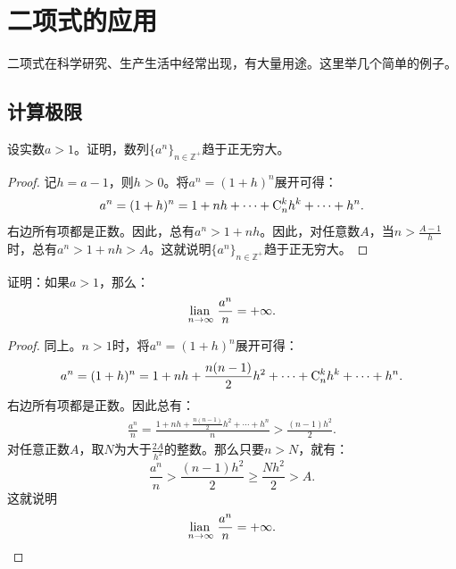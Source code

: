 \documentclass[12pt,UTF8]{ctexbook}
\begin{document}
\section{二项式的应用}

二项式在科学研究、生产生活中经常出现，有大量用途。这里举几个简单的例子。

\subsection{计算极限}

\begin{et}
    设实数$a>1$。证明，数列$\{a^n\}_{n\in\mathbb{Z}^+}$趋于正无穷大。
\end{et}

\begin{proof}
    记$h = a - 1$，则$h>0$。将$a^n = (1 + h)^n$展开可得：
    $$ a^n = (1+h)^n = 1 + nh + \cdots +  \mathrm{C}_{n}^{k}h^k + \cdots + h^n.$$
    右边所有项都是正数。因此，总有$a^n > 1+nh$。因此，对任意数$A$，当$n>\frac{A-1}{h}$时，总有$a^n>1+nh>A$。这就说明$\{a^n\}_{n\in\mathbb{Z}^+}$趋于正无穷大。
\end{proof}

\begin{et}
    证明：如果$a>1$，那么：
    $$ \underset{n\to\infty}{\operatorname{lian}\,}\; \frac{a^n}{n} = +\infty.$$
\end{et}
\begin{proof}
    同上。$n > 1$时，将$a^n = (1 + h)^n$展开可得：
    $$ a^n = (1 + h)^n = 1 + nh + \frac{n(n-1)}{2}h^2 + \cdots + \mathrm{C}_{n}^{k}h^k + \cdots + h^n.$$
    右边所有项都是正数。因此总有：
    \begin{align*}
        \frac{a^n}{n} = \frac{1 + nh + \frac{n(n-1)}{2}h^2 + \cdots + h^n}{n} > \frac{(n-1)h^2}{2}.
    \end{align*}
    对任意正数$A$，取$N$为大于$\frac{2A}{h^2}$的整数。那么只要$n>N$，就有：
    $$ \frac{a^n}{n} > \frac{(n-1)h^2}{2} \geqslant \frac{Nh^2}{2} > A. $$
    这就说明
    $$ \underset{n\to\infty}{\operatorname{lian}\,}\; \frac{a^n}{n} = +\infty.$$
\end{proof}
\end{document}
